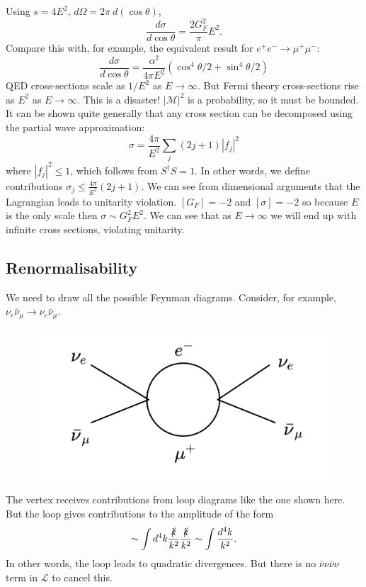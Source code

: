 \documentclass[a4paper,12pt]{article}
\begin{document}
Using $s=4E^2$, $d\Omega = 2\pi\ d(\cos\theta)$,
\begin{equation}
\frac{d\sigma}{d\cos\theta} = \frac{2G_F^2}{\pi}E^2.
\end{equation}
Compare this with, for example, the equivalent result for $e^+e^- \to \mu^+\mu^-$:
\begin{equation}
\frac{d\sigma}{d\cos\theta} = \frac{\alpha^2}{4\pi E^2}(\cos^4\theta/2 + \sin^4\theta/2)
\end{equation}
QED cross-sections scale as $1/E^2$ as $E \to \infty$. But Fermi theory cross-sections rise as $E^2$ as $E \to \infty$. This is a disaster! $|\mathcal{M}|^2$ is a probability, so it must be bounded. It can be shown quite generally that any cross section can be decomposed using the partial wave approximation:
\begin{equation}
\sigma = \frac{4\pi}{E^2}\sum_j(2j+1)|f_j|^2
\end{equation}
where $|f_j|^2 \leq 1$, which follows from $S^\dagger S =1$. In other words, we define contributions $\sigma_j \leq \frac{4\pi}{E^2}(2j+1)$. We can see from dimensional arguments that the Lagrangian leads to unitarity violation. $[G_F]=-2$ and $[\sigma]=-2$ so because $E$ is the only scale then $\sigma \sim G_F^2E^2$. We can see that as $E \to \infty$ we will end up with infinite cross sections, violating unitarity. 
%
\subsection{Renormalisability}
%
We need to draw all the possible Feynman diagrams. Consider, for example, $\nu_e\bar{\nu}_\mu \to \nu_e\bar{\nu}_\mu$.
\begin{figure}
  \centering
  \includegraphics[width=\linewidth]{figs/diag_6.png}
\end{figure}
The vertex receives contributions from loop diagrams like the one shown here. But the loop gives contributions to the amplitude of the form
\begin{equation}
\sim \int d^4k \frac{\slashed{k}}{k^2}\frac{\slashed{k}}{k^2} \sim \int \frac{d^4k}{k^2}.
\end{equation}
In other words, the loop leads to quadratic divergences. But there is no $\bar{\nu}\nu\bar{\nu}\nu$ term in $\mathcal{L}$ to cancel this.
%
\end{document}
